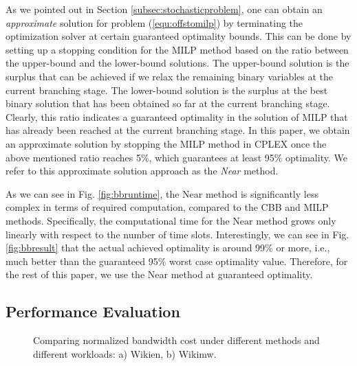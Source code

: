 \documentclass[10pt,journal,compsoc]{IEEEtran}
\begin{document}
As we pointed out in Section \ref{subsec:stochasticproblem}, one can obtain an \emph{approximate} solution for problem (\ref{equ:offstomilp}) by terminating the optimization solver at certain guaranteed optimality bounds. This can be done by setting up a stopping condition for the MILP method based on the ratio between the upper-bound and the lower-bound solutions. The upper-bound solution is the surplus that can be achieved if we relax the remaining binary variables at the current branching stage. The lower-bound solution is the surplus at the best binary solution that has been obtained so far at the current branching stage. Clearly, this ratio indicates a guaranteed optimality in the  solution of MILP that has already been reached at the current branching stage. In this paper, we obtain an approximate solution by stopping the MILP method in CPLEX once the above mentioned ratio reaches 5\%, which guarantees at least 95\% optimality. We refer to this approximate solution approach as the \emph{Near} method.

As we can see in Fig. \ref{fig:bbruntime}, the Near method is significantly less  complex in terms of required computation,  compared to the CBB and MILP methods. Specifically, the computational time for the Near method grows only linearly with respect to the number of time slots. Interestingly, we can see in Fig. \ref{fig:bbresult} that the actual achieved optimality is around 99\% or more, i.e., much better than the guaranteed 95\% worst case optimality value.
Therefore, for the rest of this paper, we use the Near method at  guaranteed optimality.







\subsection{Performance Evaluation}\label{subsec:performanceevaluation}

\begin{figure}[!t]
\centering
{}
\caption{Comparing normalized bandwidth cost under different methods and different workloads: a) Wikien, b) Wikimw.\vspace{-0.2cm}}\label{fig:bandwidthcost}
\end{figure}
\end{document}
